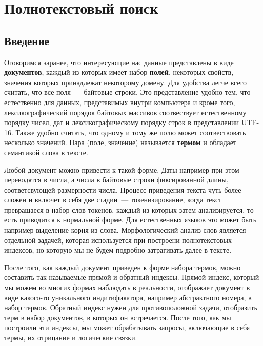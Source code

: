 \section{Полнотекстовый поиск}

\subsection{Введение}

Оговоримся заранее, что интересующие нас данные представлены в виде \textbf{документов}, каждый из которых имеет набор \textbf{полей}, некоторых свойств, значения которых принадлежат некоторому домену. Для удобства легче всего считать, что все поля~--- байтовые строки. Это представление удобно тем, что естественно для данных, представимых внутри компьютера и кроме того, лексикографический порядок байтовых массивов соотвествует естественному порядку чисел, дат и лексикографическому порядку строк в представлении UTF-16. Также удобно считать, что одному и тому же полю может соотвествовать несколько значений. Пара (поле, значение) называется \textbf{термом} и обладает семантикой слова в тексте.

Любой документ можно привести к такой форме. Даты например при этом переводятся в числа, а числа в байтовые строки фиксированной длины, соответсвующей размерности числа. Процесс приведения текста чуть более сложен и включет в себя две стадии~--- токенизирование, когда текст превращаеся в набор слов-токенов, каждый из которых затем анализируется, то есть приводится к нормальной форме. Для естественных языков это может быть например выделение корня из слова. Морфологический анализ слов является отдельной задачей, которая используется при построени полнотекстовых индексов, но которую мы не будем подробно затрагивать далее в тексте.

После того, как каждый документ приведен к форме набора термов, можно составить так называемые прямой и обратный индексы. Прямой индекс, который мы можем во многих формах наблюдать в реальности, отображает документ в виде какого-то уникального индитификатора, например абстрактного номера, в набор термов. Обратный индекс нужен для противоположной задачи, отобразить терм в набор документов, в которых он встречается. После того, как мы построили эти индексы, мы может обрабатывать запросы, включающие в себя термы, их отрицание и логические связки. 

\clearpage
